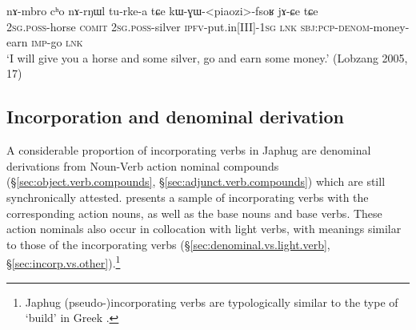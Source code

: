 \begin{exe}
\ex \label{ex:kWGWpiaozifsoR}
\gll nɤ-mbro cʰo nɤ-rŋɯl tu-rke-a tɕe kɯ-ɣɯ-<piaozi>-fsoʁ jɤ-ɕe tɕe \\
\textsc{2sg}.\textsc{poss}-horse \textsc{comit} \textsc{2sg}.\textsc{poss}-silver \textsc{ipfv}-put.in[III]-\textsc{1sg} \textsc{lnk} \textsc{sbj}:\textsc{pcp}-\textsc{denom}-money-earn \textsc{imp}-go \textsc{lnk} \\
\glt `I will give you a horse and some silver, go and earn some money.' (Lobzang 2005, 17)
\end{exe}

\subsection{Incorporation and denominal derivation} \label{sec:incorp.denom}
A considerable proportion of incorporating verbs in Japhug are denominal derivations from Noun-Verb action nominal compounds (§\ref{sec:object.verb.compounds}, §\ref{sec:adjunct.verb.compounds}) which are still synchronically attested.  presents a sample of incorporating verbs with the corresponding action nouns, as well as the base nouns and base verbs. These action nominals also occur in collocation with light verbs, with meanings similar to those of the incorporating verbs (§\ref{sec:denominal.vs.light.verb}, §\ref{sec:incorp.vs.other}).\footnote{Japhug (pseudo-)incorporating verbs are typologically similar to the type of  `build' in Greek \citep{benveniste66incorp}. 
}

